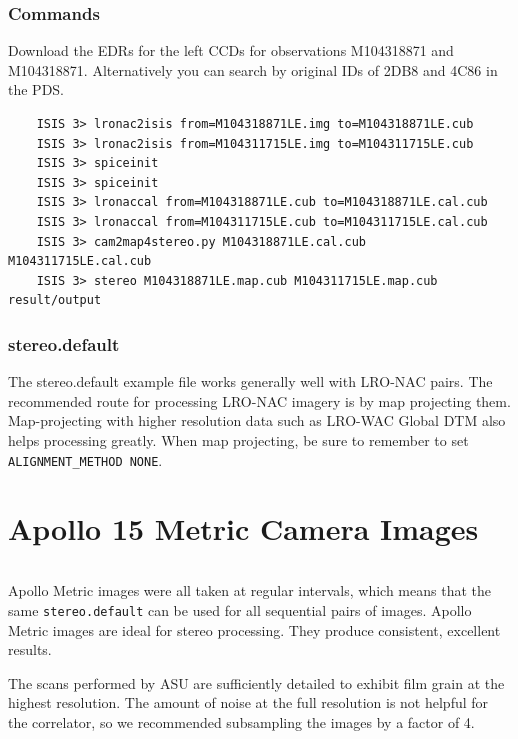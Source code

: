 \subsubsection*{Commands}

Download the EDRs for the left CCDs for observations M104318871 and
M104318871. Alternatively you can search by original IDs of 2DB8 and
4C86 in the PDS.

\begin{verbatim}
    ISIS 3> lronac2isis from=M104318871LE.img to=M104318871LE.cub
    ISIS 3> lronac2isis from=M104311715LE.img to=M104311715LE.cub
    ISIS 3> spiceinit
    ISIS 3> spiceinit
    ISIS 3> lronaccal from=M104318871LE.cub to=M104318871LE.cal.cub
    ISIS 3> lronaccal from=M104311715LE.cub to=M104311715LE.cal.cub
    ISIS 3> cam2map4stereo.py M104318871LE.cal.cub M104311715LE.cal.cub
    ISIS 3> stereo M104318871LE.map.cub M104311715LE.map.cub result/output
\end{verbatim}

\subsubsection*{stereo.default}

The stereo.default example file works generally well with LRO-NAC pairs. The recommended route for processing LRO-NAC imagery is by map projecting them. Map-projecting with higher resolution data such as LRO-WAC Global DTM also helps processing greatly. When map projecting, be sure to remember to set \texttt{ALIGNMENT\_METHOD NONE}.

\section{Apollo 15 Metric Camera Images}

\begin{tabular}{ r c r c}

\end{tabular}

Apollo Metric images were all taken at regular intervals, which means
that the same \texttt{stereo.default} can be used for all sequential pairs of
images. Apollo Metric images are ideal for stereo processing.  They
produce consistent, excellent results.

The scans performed by ASU are sufficiently detailed to exhibit film
grain at the highest resolution.  The amount of noise at the full
resolution is not helpful for the correlator, so we recommended
subsampling the images by a factor of 4.

